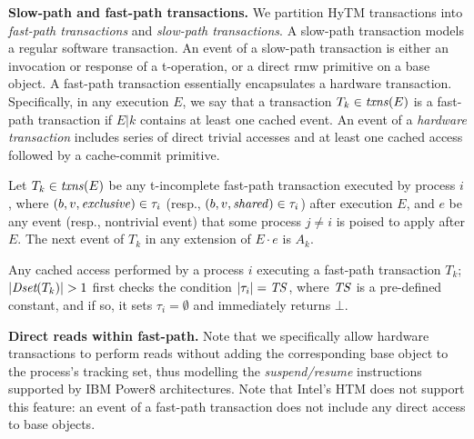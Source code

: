 \vspace{1mm}\noindent\textbf{Slow-path and fast-path transactions.}
We partition HyTM transactions into \emph{fast-path transactions} and \emph{slow-path transactions}.
A slow-path transaction models a regular software transaction.
An event of a slow-path transaction is either an invocation or response of a t-operation, or
a direct rmw primitive on a base object. 
A fast-path transaction essentially encapsulates a hardware transaction. Specifically, in any execution $E$,
we say that a transaction $T_k\in \ms{txns}(E)$ is a fast-path transaction if $E|k$ contains at least one cached event.
An event of a \emph{hardware transaction} includes series of direct trivial accesses and at least one cached access
followed by a cache-commit primitive.
%
\begin{remark}
\label{re:traborts}
%
Let $T_k \in \ms{txns}(E)$ be any t-incomplete fast-path transaction executed by process $i$, 
where $(b,v,\mathit{exclusive})\in\tau_i$ (resp., $(b,v,\mathit{shared})\in\tau_i$) after execution $E$, and $e$ be any event (resp., nontrivial event) 
that some process $j\neq i$ is poised to apply after $E$.
The next event of $T_k$ in any extension of $E\cdot e$ is $A_k$.
%
\end{remark}
%
%
\begin{remark}
\label{re:capacity}
Any cached access performed by a process $i$ executing a fast-path 
transaction $T_k$; $|\Dset(T_k)|>1$ first checks the condition $|\tau_i|=\mathit{TS}$, where $\mathit{TS}$ is a pre-defined constant, and if so, it
sets $\tau_i=\emptyset$ and immediately returns $\bot$. 
\end{remark}

\vspace{1mm}\noindent\textbf{Direct reads within fast-path.}
Note that we specifically allow hardware transactions to perform reads without adding the corresponding base object to
the process's tracking set, thus modelling the \emph{suspend/resume} instructions supported by 
IBM Power8 architectures. Note that Intel's HTM does not support this feature: an event of a fast-path transaction
does not include any direct access to base objects.


